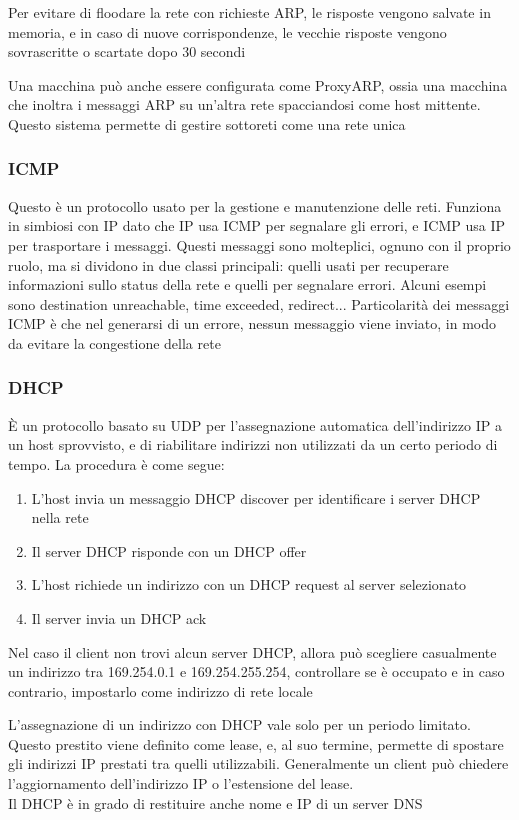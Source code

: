 \documentclass[12pt, a4paper]{article}
\begin{document}
Per evitare di floodare la rete con richieste ARP, le risposte vengono salvate in memoria, e in caso di nuove 
corrispondenze, le vecchie risposte vengono sovrascritte o scartate dopo 30 secondi

Una macchina può anche essere configurata come ProxyARP, ossia una macchina che inoltra i messaggi ARP 
su un'altra rete spacciandosi come host mittente. Questo sistema permette di gestire sottoreti come una rete 
unica

\subsubsection{ICMP}
Questo è un protocollo usato per la gestione e manutenzione delle reti. Funziona in simbiosi con IP dato che 
IP usa ICMP per segnalare gli errori, e ICMP usa IP per trasportare i messaggi.
Questi messaggi sono molteplici, ognuno con il proprio ruolo, ma si dividono in due classi principali: quelli
usati per recuperare informazioni sullo status della rete e quelli per segnalare errori. Alcuni esempi sono
destination unreachable, time exceeded, redirect...
Particolarità dei messaggi ICMP è che nel generarsi di un errore, nessun messaggio viene inviato, in modo da evitare
la congestione della rete

\subsubsection{DHCP}
È un protocollo basato su UDP per l'assegnazione automatica dell'indirizzo IP a un host sprovvisto, e di riabilitare
indirizzi non utilizzati da un certo periodo di tempo. La procedura è come segue:
\begin{enumerate}
    \item L'host invia un messaggio DHCP discover per identificare i server DHCP nella rete
    \item Il server DHCP risponde con un DHCP offer
    \item L'host richiede un indirizzo con un DHCP request al server selezionato
    \item Il server invia un DHCP ack
\end{enumerate}
Nel caso il client non trovi alcun server DHCP, allora può scegliere casualmente un indirizzo tra 169.254.0.1 e
169.254.255.254, controllare se è occupato e in caso contrario, impostarlo come indirizzo di rete locale

L'assegnazione di un indirizzo con DHCP vale solo per un periodo limitato. Questo prestito viene definito come lease,
e, al suo termine, permette di spostare gli indirizzi IP prestati tra quelli utilizzabili. Generalmente un client
può chiedere l'aggiornamento dell'indirizzo IP o l'estensione del lease.\\Il DHCP è in grado di restituire anche 
nome e IP di un server DNS
\end{document}
